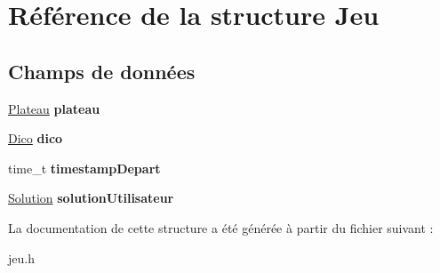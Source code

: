\hypertarget{structJeu}{
\section{Référence de la structure Jeu}
\label{structJeu}
}
\subsection*{Champs de données}
\begin{DoxyCompactItemize}
\item 
\hypertarget{structJeu_af2931c71f6de940ec7ed3fcd2f9d7158}{
\hyperlink{structPlateau}{Plateau} {\bfseries plateau}}
\label{structJeu_af2931c71f6de940ec7ed3fcd2f9d7158}

\item 
\hypertarget{structJeu_a6bda384c6fca4e83ae15ac69f2228a41}{
\hyperlink{structDico}{Dico} {\bfseries dico}}
\label{structJeu_a6bda384c6fca4e83ae15ac69f2228a41}

\item 
\hypertarget{structJeu_af48a5fddf1dc40b7c4a85918d73f201d}{
time\_\-t {\bfseries timestampDepart}}
\label{structJeu_af48a5fddf1dc40b7c4a85918d73f201d}

\item 
\hypertarget{structJeu_ae8e1dca71285915404d1de4ff609a1d6}{
\hyperlink{structSolution}{Solution} {\bfseries solutionUtilisateur}}
\label{structJeu_ae8e1dca71285915404d1de4ff609a1d6}

\end{DoxyCompactItemize}


La documentation de cette structure a été générée à partir du fichier suivant :\begin{DoxyCompactItemize}
\item 
jeu.h\end{DoxyCompactItemize}
